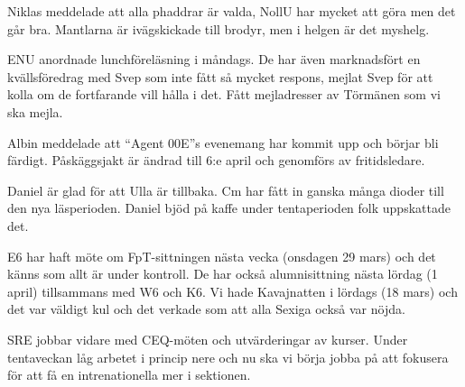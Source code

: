 \documentclass[10pt]{article}
\begin{document}
\begin{paragrafer}
\begin{paragrafer}
Niklas meddelade att alla phaddrar är valda, NollU har mycket att göra men det går bra. Mantlarna är ivägskickade till brodyr, men i helgen är det myshelg.

ENU anordnade lunchföreläsning i måndags. De har även marknadsfört en kvällsföredrag med Svep som inte fått så mycket respons, mejlat Svep för att kolla om de fortfarande vill hålla i det. Fått mejladresser av Törmänen som vi ska mejla.

Albin meddelade att ``Agent 00E''s evenemang har kommit upp och börjar bli färdigt. Påskäggsjakt är ändrad till 6:e april och genomförs av fritidsledare.

Daniel är glad för att Ulla är tillbaka. Cm har fått in ganska många dioder till den nya läsperioden. Daniel bjöd på kaffe under tentaperioden folk uppskattade det.

E6 har haft möte om FpT-sittningen nästa vecka (onsdagen 29 mars) och det känns som allt är under kontroll. De har också alumnisittning nästa lördag (1 april) tillsammans med W6 och K6.
Vi hade Kavajnatten i lördags (18 mars) och det var väldigt kul och det verkade som att alla Sexiga också var nöjda.

SRE jobbar vidare med CEQ-möten och utvärderingar av kurser. Under tentaveckan låg arbetet i princip nere och nu ska vi börja jobba på att fokusera för att få en intrenationella mer i sektionen.


\end{paragrafer}
\end{paragrafer}
\end{document}
